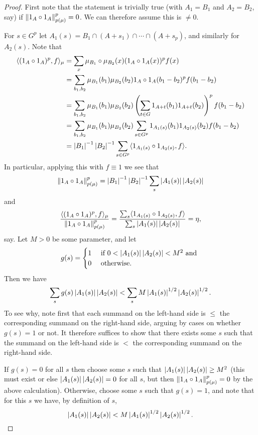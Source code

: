 \begin{proof}
\leanok
First note that the statement is trivially true (with $A_1=B_1$ and $A_2=B_2$, say) if $\lVert 1_{A}\circ 1_{A}\rVert_{p(\mu)}^p=0$. We can therefore assume this is $\neq 0$.

For $s\in G^{p}$ let $A_1(s)=B_1\cap (A+s_1)\cap\cdots\cap (A+s_{p})$, and similarly for $A_2(s)$. Note that
\begin{align*}
\langle (1_{A}\circ 1_{A})^p, f\rangle_\mu
&=\sum_{x} \mu_{B_1}\circ \mu_{B_2}(x)(1_{A}\circ 1_{A}(x))^pf(x)\\
&=\sum_{b_1,b_2}\mu_{B_1}(b_1)\mu_{B_2}(b_2)1_{A}\circ 1_{A}(b_1-b_2)^{p}f(b_1-b_2)\\
&=\sum_{b_1,b_2}\mu_{B_1}(b_1)\mu_{B_2}(b_2)\left( \sum_{t\in G}1_{A+t}(b_1)1_{A+t}(b_2)\right)^{p}f(b_1-b_2)\\
&=\sum_{b_1,b_2}\mu_{B_1}(b_1)\mu_{B_2}(b_2)\sum_{s\in G^p}1_{A_1(s)}(b_1)1_{A_2(s)}(b_2)f(b_1-b_2)\\
&=\left\lvert B_1\right\rvert^{-1}\left\lvert B_2\right\rvert^{-1}\sum_{s\in G^p}\langle 1_{A_1(s)}\circ 1_{A_2(s)}, f\rangle.
\end{align*}
In particular, applying this with $f\equiv 1$ we see that
\[\lVert 1_{A}\circ 1_{A}\rVert_{p(\mu)}^p=\left\lvert B_1\right\rvert^{-1}\left\lvert B_2\right\rvert^{-1}\sum_s\left\lvert A_1(s)\right\rvert\left\lvert A_2(s)\right\rvert\]
and
\[\frac{\langle (1_{A}\circ 1_{A})^p,f\rangle_\mu}{\lVert 1_{A}\circ 1_{A}\rVert_{p(\mu)}^p}=\frac{\sum_{s}\langle 1_{A_1(s)}\circ 1_{A_2(s)}, f\rangle}{\sum_s \left\lvert A_1(s)\right\rvert\left\lvert A_2(s)\right\rvert}=\eta,\]
say. Let $M>0$ be some parameter, and let
\[g(s) = \begin{cases} 1&\textrm{ if }0<\left\lvert A_1(s)\right\rvert\left\lvert A_2(s)\right\rvert<M^2\textrm{ and }\\0&\textrm{ otherwise.}\end{cases}\]
Then we have
\[\sum_s g(s)\left\lvert A_1(s)\right\rvert\left\lvert A_2(s)\right\rvert
<\sum_s M\left\lvert A_1(s)\right\rvert^{1/2}\left\lvert A_2(s)\right\rvert^{1/2}.\]
To see why, note first that each summand on the left-hand side is $\leq$ the corresponding summand on the right-hand side, arguing by cases on whether $g(s)=1$ or not. It therefore suffices to show that there exists some $s$ such that the summand on the left-hand side is $<$ the corresponding summand on the right-hand side.

If $g(s)=0$ for all $s$ then choose some $s$ such that $\left\lvert A_1(s)\right\rvert\left\lvert A_2(s)\right\rvert\geq M^2$ (this must exist or else $\left\lvert A_1(s)\right\rvert\left\lvert A_2(s)\right\rvert=0$ for all $s$, but then $\lVert 1_A\circ 1_A\rVert_{p(\mu)}^p=0$ by the above calculation). Otherwise, choose some $s$ such that $g(s)=1$, and note that for this $s$ we have, by definition of $s$,
\[\left\lvert A_1(s)\right\rvert\left\lvert A_2(s)\right\rvert<M\left\lvert A_1(s)\right\rvert^{1/2}\left\lvert A_2(s)\right\rvert^{1/2}.\]


\end{proof}
